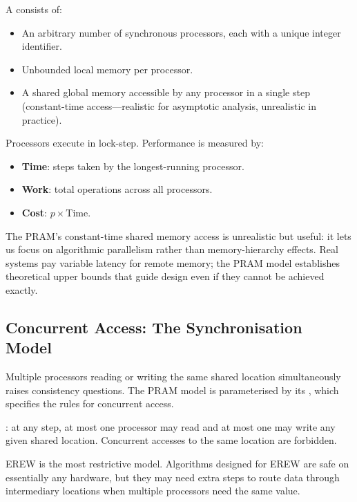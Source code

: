 \begin{ppdefn}
A  consists of:
\begin{itemize}
  \item An arbitrary number of synchronous processors, each with a unique
        integer identifier.
  \item Unbounded local memory per processor.
  \item A shared global memory accessible by any processor in a single step
        (constant-time access---realistic for asymptotic analysis, unrealistic
        in practice).
\end{itemize}
Processors execute in lock-step. Performance is measured by:
\begin{itemize}
  \item \textbf{Time}: steps taken by the longest-running processor.
  \item \textbf{Work}: total operations across all processors.
  \item \textbf{Cost}: $p \times \text{Time}$.
\end{itemize}
\end{ppdefn}

\begin{ppnote}
The PRAM's constant-time shared memory access is unrealistic but useful: it
lets us focus on algorithmic parallelism rather than memory-hierarchy effects.
Real systems pay variable latency for remote memory; the PRAM model establishes
theoretical upper bounds that guide design even if they cannot be achieved
exactly.
\end{ppnote}

\subsection{Concurrent Access: The Synchronisation Model}

Multiple processors reading or writing the same shared location simultaneously
raises consistency questions. The PRAM model is parameterised by its
, which specifies the rules for concurrent access.

\begin{ppdefn}
: at any step, at most one
processor may read and at most one may write any given shared location.
Concurrent accesses to the same location are forbidden.
\end{ppdefn}

EREW is the most restrictive model. Algorithms designed for EREW are safe on
essentially any hardware, but they may need extra steps to route data through
intermediary locations when multiple processors need the same value.

